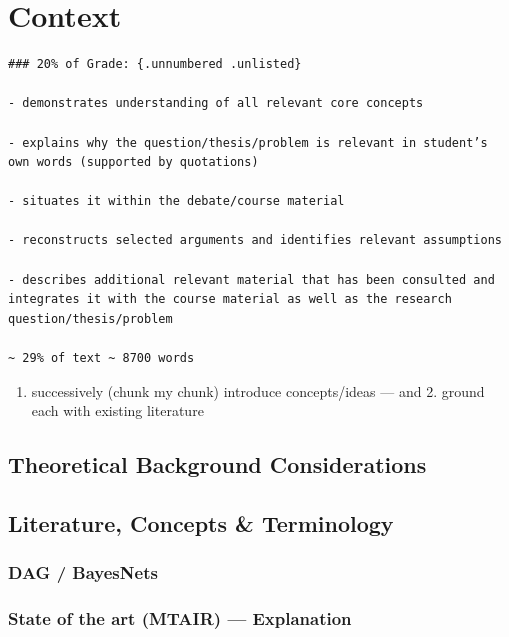 \documentclass[
  letterpaper,
]{book}
\providecommand{\tightlist}{%
  \setlength{\itemsep}{0pt}\setlength{\parskip}{0pt}}
\begin{document}
\chapter{Context}\label{context}

\begin{verbatim}
### 20% of Grade: {.unnumbered .unlisted}

- demonstrates understanding of all relevant core concepts

- explains why the question/thesis/problem is relevant in student’s own words (supported by quotations)

- situates it within the debate/course material

- reconstructs selected arguments and identifies relevant assumptions

- describes additional relevant material that has been consulted and integrates it with the course material as well as the research question/thesis/problem

~ 29% of text ~ 8700 words
\end{verbatim}

\begin{enumerate}
\def\labelenumi{\arabic{enumi}.}
\tightlist
\item
  successively (chunk my chunk) introduce concepts/ideas --- and 2.
  ground each with existing literature
\end{enumerate}

\section{Theoretical Background
Considerations}\label{theoretical-background-considerations}

\section{Literature, Concepts \&
Terminology}\label{literature-concepts-terminology}

\subsection{DAG / BayesNets}\label{dag-bayesnets}

\subsection{State of the art (MTAIR) ---
Explanation}\label{state-of-the-art-mtair-explanation}
\end{document}
